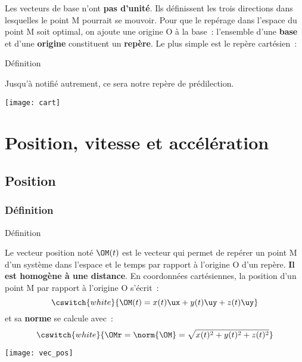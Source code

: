 \documentclass[../main/main.tex]{subfiles}
\begin{document}
Les vecteurs de base n'ont \textbf{pas d'unité}. Ils définissent les trois
directions dans lesquelles le point M pourrait se mouvoir. Pour que le repérage
dans l'espace du point M soit optimal, on ajoute une origine O à la base~:
l'ensemble d'une \textbf{base} et d'une \textbf{origine} constituent un
\textbf{repère}. Le plus simple est le repère cartésien~:
\begin{bdefi}{Définition}
    \begin{minipage}{0.70\linewidth}
        \bigbreak
        Jusqu'à notifié autrement, ce sera notre repère de prédilection.
    \end{minipage}
    \hfill
    \begin{minipage}{0.25\linewidth}
        \begin{center}
            \texttt{[image: cart]}
        \end{center}
    \end{minipage}
\end{bdefi}

\section{Position, vitesse et accélération}
\subsection{Position}
\subsubsection{Définition}

\begin{bdefi}{Définition}
    \begin{minipage}{0.70\linewidth}
        Le vecteur position noté $\OM(t)$ est le vecteur qui permet de repérer
        un point M d'un système dans l'espace et le temps par rapport à
        l'origine O d'un repère. \textbf{Il est homogène à une distance}.
        \smallbreak
        En coordonnées cartésiennes, la position d'un point M par rapport à
        l'origine O s'écrit~:
        \[\cswitch{white}{\OM(t) = x(t)\ux + y(t)\uy + z(t)\uy}\]
        et sa \textbf{norme} se calcule avec~:
        \[\cswitch{white}{\OMr = \norm{\OM} = \sqrt{x(t)^2 + y(t)^2 + z(t)^2}}\]
    \end{minipage}
    \hfill
    \begin{minipage}{0.29\linewidth}
        \begin{center}
            \texttt{[image: vec\_pos]}
        \end{center}
    \end{minipage}
\end{bdefi}
\end{document}
